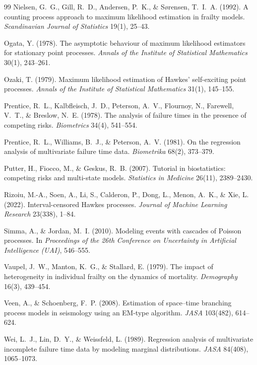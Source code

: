 \documentclass[11pt]{article}
\numberwithin{assumption}{section}
\numberwithin{proposition}{section}
\numberwithin{remark}{section}
\begin{document}
\begin{thebibliography}{99}
Nielsen, G.~G., Gill, R.~D., Andersen, P.~K., \& S{\o}rensen, T.~I.~A.
(1992). A counting process approach to maximum likelihood estimation in
frailty models. \emph{Scandinavian Journal of Statistics} 19(1), 25--43.

Ogata, Y. (1978). The asymptotic behaviour of maximum likelihood
estimators for stationary point processes. \emph{Annals of the Institute
of Statistical Mathematics} 30(1), 243--261.

Ozaki, T. (1979). Maximum likelihood estimation of Hawkes' self-exciting
point processes. \emph{Annals of the Institute of Statistical
Mathematics} 31(1), 145--155.

Prentice, R.~L., Kalbfleisch, J.~D., Peterson, A.~V., Flournoy, N.,
Farewell, V.~T., \& Breslow, N.~E. (1978). The analysis of failure times
in the presence of competing risks. \emph{Biometrics} 34(4), 541--554.

Prentice, R.~L., Williams, B.~J., \& Peterson, A.~V. (1981). On the
regression analysis of multivariate failure time data. \emph{Biometrika}
68(2), 373--379.

Putter, H., Fiocco, M., \& Geskus, R.~B. (2007). Tutorial in
biostatistics: competing risks and multi-state models. \emph{Statistics in
Medicine} 26(11), 2389--2430.

Rizoiu, M.-A., Soen, A., Li, S., Calderon, P., Dong, L., Menon, A.~K., \&
Xie, L. (2022). Interval-censored Hawkes processes. \emph{Journal of
Machine Learning Research} 23(338), 1--84.

Simma, A., \& Jordan, M.~I. (2010). Modeling events with cascades of
Poisson processes. In \emph{Proceedings of the 26th Conference on
Uncertainty in Artificial Intelligence (UAI)}, 546--555.

Vaupel, J.~W., Manton, K.~G., \& Stallard, E. (1979). The impact of
heterogeneity in individual frailty on the dynamics of mortality.
\emph{Demography} 16(3), 439--454.

Veen, A., \& Schoenberg, F.~P. (2008). Estimation of space--time branching
process models in seismology using an EM-type algorithm. \emph{JASA}
103(482), 614--624.

Wei, L.~J., Lin, D.~Y., \& Weissfeld, L. (1989). Regression analysis of
multivariate incomplete failure time data by modeling marginal
distributions. \emph{JASA} 84(408), 1065--1073.

\end{thebibliography}
\end{document}
